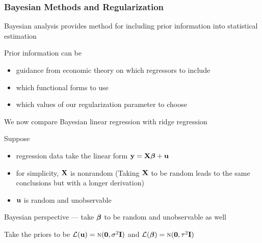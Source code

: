 \begin{frame}\frametitle{Bayesian Methods and Regularization}
    
    \vspace{2em}
    Bayesian analysis provides method for including prior information into statistical estimation
    
    \vspace{.7em}
    Prior information can be 
    \begin{itemize}
        \item guidance from
        economic theory on which regressors to include
        \item which functional forms to use
        \item which values of our regularization parameter to choose
    \end{itemize}
    
    \vspace{.7em}
    We now compare Bayesian linear regression with  ridge regression 
    
\end{frame}

\begin{frame}
    
    \vspace{2em}
    Suppose 
    
    \begin{itemize}
        \item regression data take the linear form ${\mathbf y} = \mathbf X {\boldsymbol \beta} +
                {\mathbf u}$
        \item for simplicity, $\mathbf X$ is
                nonrandom (Taking $\mathbf X$ to be random leads to the same conclusions but
                with a longer derivation)
        \item ${\mathbf u}$ is random and unobservable
    \end{itemize}
    
    \vspace{.7em}
    Bayesian perspective ---  take ${\boldsymbol \beta}$ to be random and unobservable
    as well
    
    Take the priors to be $\mathcal L({\mathbf u}) =
    \textrm{\sc n}({\mathbf 0}, \sigma^2 \mathbf I)$ and $\mathcal L({\boldsymbol \beta}) =\textrm{\sc n}({\mathbf 0}, \tau^2
    \mathbf I)$
    
\end{frame}

